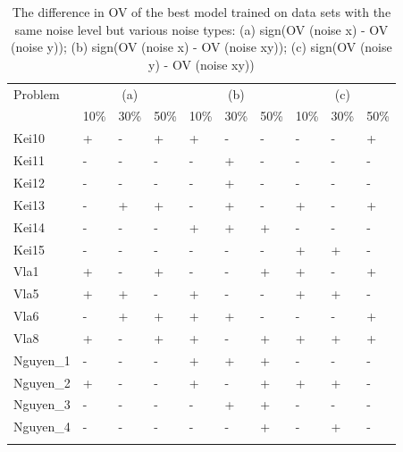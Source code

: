 \begin{table}
\caption{The difference in OV of the best model trained on data sets with the same noise level but various noise types: (a) sign(OV (noise x) - OV (noise y)); (b) sign(OV (noise x) - OV (noise xy)); (c) sign(OV (noise y) - OV (noise xy))}
\label{tab:difOV2}
\begin{tabular}{l|lll|lll|lll}
\hline\noalign{\smallskip}
Problem & \multicolumn{3}{c|}{(a)} & \multicolumn{3}{c|}{(b)} & \multicolumn{3}{c}{(c)} \\
 & 10\% & 30\% & 50\% & 10\% & 30\% & 50\% & 10\% & 30\% & 50\% \\
\noalign{\smallskip}\hline\noalign{\smallskip}
Kei10 & + & - & + & + & - & - & - & - & + \\
Kei11 & - & - & - & - & + & - & - & - & - \\
Kei12 & - & - & - & - & + & - & - & - & - \\
Kei13 & - & + & + & - & + & - & + & - & + \\
Kei14 & - & - & - & + & + & + & - & - & - \\
Kei15 & - & - & - & - & - & - & + & + & - \\
Vla1 & + & - & + & - & - & + & + & - & + \\
Vla5 & + & + & - & + & - & - & + & + & - \\
Vla6 & - & + & + & + & + & - & - & - & + \\
Vla8 & + & - & + & + & - & + & + & + & + \\
Nguyen\_1 & - & - & - & + & + & + & - & - & - \\
Nguyen\_2 & + & - & - & + & - & + & + & + & - \\
Nguyen\_3 & - & - & - & - & + & + & - & - & - \\
Nguyen\_4 & - & - & - & - & - & + & - & + & - \\


\noalign{\smallskip}\hline
\end{tabular}
\end{table}


